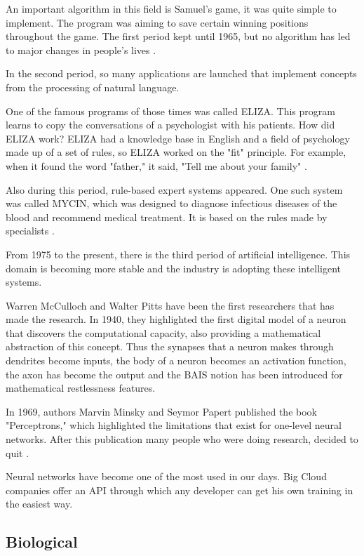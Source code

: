 An important algorithm in this field is Samuel's game, it was quite simple to implement.
The program was aiming to save certain winning positions throughout the game.
The first period kept until 1965, but no algorithm has led to major changes in people's lives \cite{historyofneuronalnetwork}.

In the second period, so many applications
 are launched that implement concepts from the processing of natural language.
 
One of the famous programs of those times was called ELIZA. This program learns to copy the conversations of a psychologist with his patients.
How did ELIZA work? 
ELIZA had a knowledge base in English and a field of psychology made up of a set of rules,  
so ELIZA worked on the "fit" principle.
For example, when it found the word "father," it said, "Tell me about your family" \cite{historyofneuronalnetwork}.

 Also during this period, rule-based expert systems appeared. 
One such system was called MYCIN, which was designed to diagnose infectious diseases of the blood and recommend medical treatment. It is based on the rules made by specialists \cite{historyofneuronalnetwork}. 

From 1975 to the present, there is the third period of artificial intelligence. 
This domain is becoming more stable and the industry is adopting these intelligent systems.

Warren McCulloch and Walter Pitts have been the first researchers that has made the research. 
In 1940, they highlighted the first digital model of a neuron that discovers the computational capacity, 
also providing a mathematical abstraction of this concept.
Thus the synapses that a neuron makes through dendrites become inputs, 
the body of a neuron becomes an activation function, the axon has become the output and 
the BAIS notion has been introduced for mathematical restlessness features. \cite{historyofneuronalnetworkstanford}


In 1969, authors Marvin Minsky and Seymor Papert published the book "Perceptrons," which highlighted the limitations that exist for one-level neural networks.
After this publication many people who were doing research, decided to quit \cite{historyofneuronalnetworkstanford}. 

Neural networks have become one of the most used in our days. 
Big Cloud companies offer an API through which any developer can get his own training in the easiest way.
 
\subsection{Biological}

